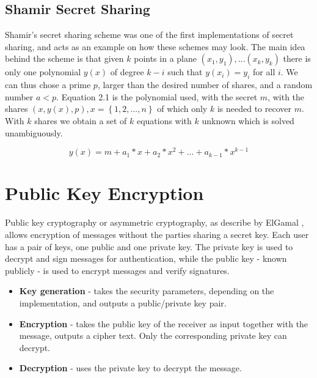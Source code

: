 \subsection{Shamir Secret  Sharing}\label{sec:secret_sharing}
 Shamir's secret sharing scheme \cite{shamir_share} was one of the first implementations of secret sharing, and acts as an example on how these schemes may look. The main idea behind the scheme is that given $k$ points in a plane $(x_1,y_1), ... (x_k,y_k)$ there is only one polynomial $y(x)$ of degree $k-i$ such that $y(x_i) = y_i$ for all $i$. We can thus chose a prime $p$, larger than the desired number of shares, and a random number $a < p$. Equation 2.1 is the polynomial used, with the secret $m$, with the shares $(x, y(x), p) , x=\left\{ {1,2, ... ,n}\right\}$ of which only $k$ is needed to recover $m$. With $k$ shares we obtain a set of $k$ equations with $k$ unknown which is solved unambiguously.

\begin{equation}
 y(x) = m + a_1*x + a_2*x^2 + ... + a_{k-1} * x^{k-1} 
\end{equation}\label{eq:polynom}


\section{Public Key Encryption}\label{sec:pke}
Public key cryptography or asymmetric cryptography, as describe by ElGamal \cite{elgamal},  allows encryption of messages without the parties sharing a secret key. Each user has a pair of keys, one public and one private key. The private key is used to decrypt and sign messages for authentication, while the public key - known publicly - is used to encrypt messages and verify signatures. 
\begin{itemize}
\item \textbf{Key generation} - takes the security parameters, depending on the implementation, and outputs a public/private key pair.
\item \textbf{ Encryption } - takes the public key of the receiver as input together with the message, outputs a cipher text. Only the corresponding private key can decrypt.
\item \textbf{ Decryption } - uses the private key to decrypt the message.
\end{itemize}

